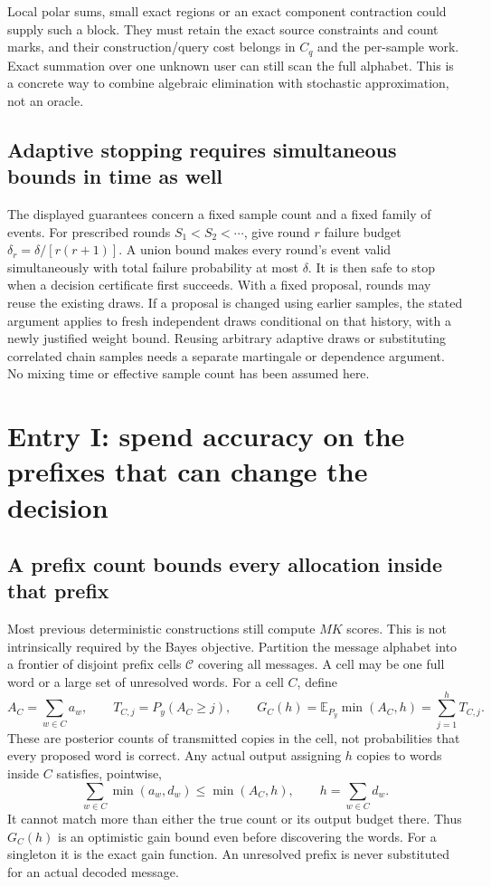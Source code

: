 \documentclass[10pt,a4paper]{article}
\newcommand{\E}{\mathbb E}
\begin{document}
Local polar sums, small exact regions or an exact component contraction could supply such a block.
They must retain the exact source constraints and count marks, and their construction/query cost belongs
in $C_q$ and the per-sample work. Exact summation over one unknown user can still scan the full alphabet.
This is a concrete way to combine algebraic elimination with stochastic approximation, not an oracle.

\subsection{Adaptive stopping requires simultaneous bounds in time as well}
The displayed guarantees concern a fixed sample count and a fixed family of events. For prescribed rounds
$S_1<S_2<\cdots$, give round $r$ failure budget $\delta_r=\delta/[r(r+1)]$.
A union bound makes every round's event valid simultaneously with total failure probability at most $\delta$.
It is then safe to stop when a decision certificate first succeeds. With a fixed proposal, rounds may reuse
the existing draws. If a proposal is changed using earlier samples, the stated argument applies to fresh
independent draws conditional on that history, with a newly justified weight bound.
Reusing arbitrary adaptive draws or substituting correlated chain samples needs a separate martingale or
dependence argument. No mixing time or effective sample count has been assumed here.

\clearpage
\section{Entry I: spend accuracy on the prefixes that can change the decision}
\label{sec:prefix-decisions}
\subsection{A prefix count bounds every allocation inside that prefix}
Most previous deterministic constructions still compute $MK$ scores. This is not intrinsically required
by the Bayes objective. Partition the message alphabet into a frontier of disjoint prefix cells
$\mathcal C$ covering all messages. A cell may be one full word or a large set of unresolved words.
For a cell $C$, define
\[
 A_C=\sum_{w\in C}a_w,\qquad
 T_{C,j}=P_y(A_C\geq j),\qquad
 G_C(h)=\E_{P_y}\min(A_C,h)=\sum_{j=1}^hT_{C,j}.
\]
These are posterior counts of transmitted copies in the cell, not probabilities that every proposed word
is correct. Any actual output assigning $h$ copies to words inside $C$ satisfies, pointwise,
\begin{equation}
 \sum_{w\in C}\min(a_w,d_w)\leq\min(A_C,h),\qquad h=\sum_{w\in C}d_w.
 \label{eq:prefix-gain-bound}
\end{equation}
It cannot match more than either the true count or its output budget there. Thus $G_C(h)$ is an optimistic
gain bound even before discovering the words. For a singleton it is the exact gain function.
An unresolved prefix is never substituted for an actual decoded message.
\end{document}
